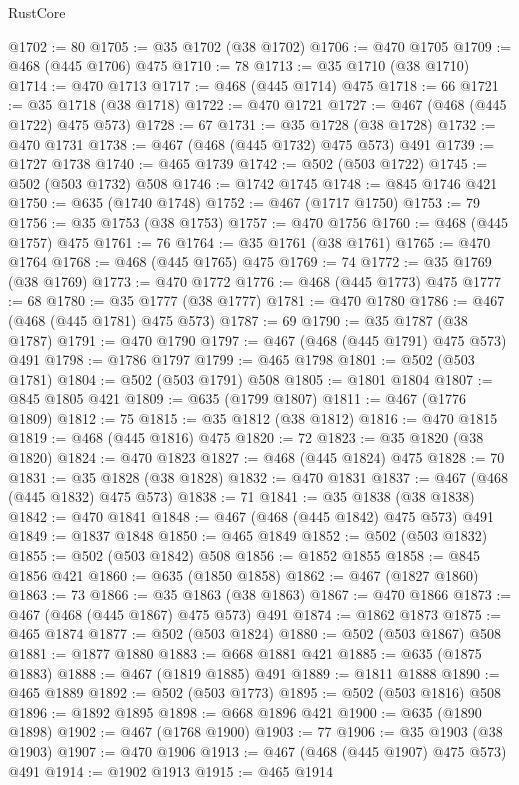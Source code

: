 \begin{lexlean}{RustCore}
\begin{coremodule}
@1702 := 80
@1705 := @35 @1702 (@38 @1702)
@1706 := @470 @1705
@1709 := @468 (@445 @1706) @475
@1710 := 78
@1713 := @35 @1710 (@38 @1710)
@1714 := @470 @1713
@1717 := @468 (@445 @1714) @475
@1718 := 66
@1721 := @35 @1718 (@38 @1718)
@1722 := @470 @1721
@1727 := @467 (@468 (@445 @1722) @475 @573)
@1728 := 67
@1731 := @35 @1728 (@38 @1728)
@1732 := @470 @1731
@1738 := @467 (@468 (@445 @1732) @475 @573) @491
@1739 := @1727 @1738
@1740 := @465 @1739
@1742 := @502 (@503 @1722)
@1745 := @502 (@503 @1732) @508
@1746 := @1742 @1745
@1748 := @845 @1746 @421
@1750 := @635 (@1740 @1748)
@1752 := @467 (@1717 @1750)
@1753 := 79
@1756 := @35 @1753 (@38 @1753)
@1757 := @470 @1756
@1760 := @468 (@445 @1757) @475
@1761 := 76
@1764 := @35 @1761 (@38 @1761)
@1765 := @470 @1764
@1768 := @468 (@445 @1765) @475
@1769 := 74
@1772 := @35 @1769 (@38 @1769)
@1773 := @470 @1772
@1776 := @468 (@445 @1773) @475
@1777 := 68
@1780 := @35 @1777 (@38 @1777)
@1781 := @470 @1780
@1786 := @467 (@468 (@445 @1781) @475 @573)
@1787 := 69
@1790 := @35 @1787 (@38 @1787)
@1791 := @470 @1790
@1797 := @467 (@468 (@445 @1791) @475 @573) @491
@1798 := @1786 @1797
@1799 := @465 @1798
@1801 := @502 (@503 @1781)
@1804 := @502 (@503 @1791) @508
@1805 := @1801 @1804
@1807 := @845 @1805 @421
@1809 := @635 (@1799 @1807)
@1811 := @467 (@1776 @1809)
@1812 := 75
@1815 := @35 @1812 (@38 @1812)
@1816 := @470 @1815
@1819 := @468 (@445 @1816) @475
@1820 := 72
@1823 := @35 @1820 (@38 @1820)
@1824 := @470 @1823
@1827 := @468 (@445 @1824) @475
@1828 := 70
@1831 := @35 @1828 (@38 @1828)
@1832 := @470 @1831
@1837 := @467 (@468 (@445 @1832) @475 @573)
@1838 := 71
@1841 := @35 @1838 (@38 @1838)
@1842 := @470 @1841
@1848 := @467 (@468 (@445 @1842) @475 @573) @491
@1849 := @1837 @1848
@1850 := @465 @1849
@1852 := @502 (@503 @1832)
@1855 := @502 (@503 @1842) @508
@1856 := @1852 @1855
@1858 := @845 @1856 @421
@1860 := @635 (@1850 @1858)
@1862 := @467 (@1827 @1860)
@1863 := 73
@1866 := @35 @1863 (@38 @1863)
@1867 := @470 @1866
@1873 := @467 (@468 (@445 @1867) @475 @573) @491
@1874 := @1862 @1873
@1875 := @465 @1874
@1877 := @502 (@503 @1824)
@1880 := @502 (@503 @1867) @508
@1881 := @1877 @1880
@1883 := @668 @1881 @421
@1885 := @635 (@1875 @1883)
@1888 := @467 (@1819 @1885) @491
@1889 := @1811 @1888
@1890 := @465 @1889
@1892 := @502 (@503 @1773)
@1895 := @502 (@503 @1816) @508
@1896 := @1892 @1895
@1898 := @668 @1896 @421
@1900 := @635 (@1890 @1898)
@1902 := @467 (@1768 @1900)
@1903 := 77
@1906 := @35 @1903 (@38 @1903)
@1907 := @470 @1906
@1913 := @467 (@468 (@445 @1907) @475 @573) @491
@1914 := @1902 @1913
@1915 := @465 @1914

\end{coremodule}
\end{lexlean}
